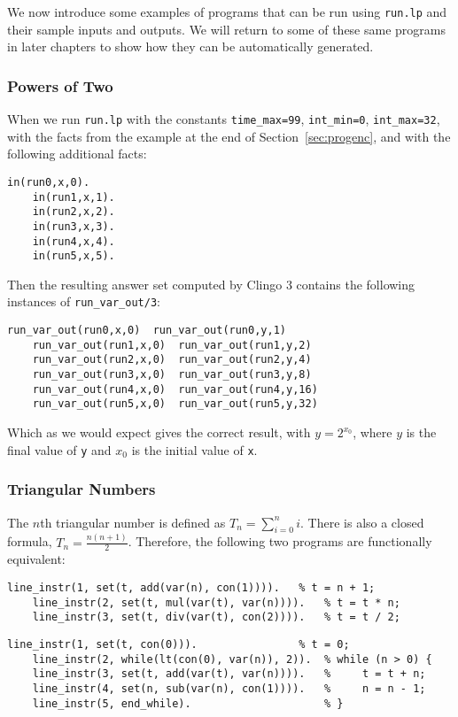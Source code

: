 \documentclass[a4paper,twoside,notitlepage]{report}
\begin{document}
We now introduce some examples of programs that can be run using 
\verb|run.lp| and their sample inputs and outputs. We will return to some 
of these same programs in later chapters to show how they can be 
automatically generated.

\subsubsection{Powers of Two}
When we run \verb|run.lp| with the constants \verb|time_max=99|, 
\verb|int_min=0|, \verb|int_max=32|, with the facts from the example at 
the end of Section~\ref{sec:progenc}, and with the following additional 
facts:
\begin{Verbatim}[samepage=true]
    in(run0,x,0).
    in(run1,x,1).
    in(run2,x,2).
    in(run3,x,3).
    in(run4,x,4).
    in(run5,x,5).
\end{Verbatim}
Then the resulting answer set computed by Clingo 3 contains the following 
instances of \verb|run_var_out/3|:
\begin{Verbatim}[samepage=true]
    run_var_out(run0,x,0)  run_var_out(run0,y,1)
    run_var_out(run1,x,0)  run_var_out(run1,y,2)
    run_var_out(run2,x,0)  run_var_out(run2,y,4)
    run_var_out(run3,x,0)  run_var_out(run3,y,8)
    run_var_out(run4,x,0)  run_var_out(run4,y,16) 
    run_var_out(run5,x,0)  run_var_out(run5,y,32)
\end{Verbatim}
Which as we would expect gives the correct result, with $y = 2^{x_0}$, 
where $y$ is the final value of \verb|y| and $x_0$ is the initial value of 
\verb|x|.

\subsubsection{Triangular Numbers}
The $n$th triangular number is defined as $T_n=\sum_{i=0}^n i$. There is 
also a closed formula, $T_n=\tfrac{n(n+1)}2$. Therefore, the following two 
programs are functionally equivalent:
\begin{Verbatim}[samepage=true]
    line_instr(1, set(t, add(var(n), con(1)))).   % t = n + 1;
    line_instr(2, set(t, mul(var(t), var(n)))).   % t = t * n;
    line_instr(3, set(t, div(var(t), con(2)))).   % t = t / 2;
\end{Verbatim}
\begin{Verbatim}[samepage=true]
    line_instr(1, set(t, con(0))).                % t = 0;
    line_instr(2, while(lt(con(0), var(n)), 2)).  % while (n > 0) {
    line_instr(3, set(t, add(var(t), var(n)))).   %     t = t + n;
    line_instr(4, set(n, sub(var(n), con(1)))).   %     n = n - 1;
    line_instr(5, end_while).                     % }
\end{Verbatim}
\end{document}
